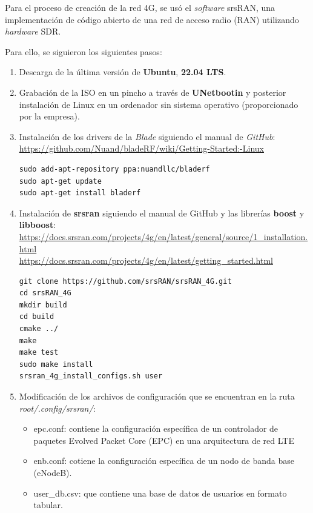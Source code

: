 Para el proceso de creación de la red 4G, se usó el \textit{software} srsRAN, una implementación de código abierto de una red de acceso radio (RAN) utilizando \textit{hardware} SDR.

Para ello, se siguieron los siguientes pasos:


\begin{enumerate}
\item Descarga de la última versión de \textbf{Ubuntu}, \textbf{22.04 LTS}.
\item Grabación de la ISO en un pincho a través de \textbf{UNetbootin} y posterior instalación de Linux en un ordenador sin sistema operativo (proporcionado por la empresa).
\item Instalación de los drivers de la \textit{Blade} siguiendo el manual de \textit{GitHub}:\\
 \url{https://github.com/Nuand/bladeRF/wiki/Getting-Started:-Linux}

\begin{lstlisting}
sudo add-apt-repository ppa:nuandllc/bladerf
sudo apt-get update
sudo apt-get install bladerf
\end{lstlisting}

\item Instalación de \textbf{srsran} siguiendo el manual de GitHub y las librerías \textbf{boost} y \textbf{libboost}:\\
\url{https://docs.srsran.com/projects/4g/en/latest/general/source/1_installation.html}\\
\url{https://docs.srsran.com/projects/4g/en/latest/getting_started.html}

\begin{lstlisting}
git clone https://github.com/srsRAN/srsRAN_4G.git
cd srsRAN_4G
mkdir build
cd build
cmake ../
make
make test
sudo make install
srsran_4g_install_configs.sh user
\end{lstlisting}

\item Modificación de los archivos de configuración que se encuentran en la ruta \textit{root/.config/srsran/}:
\begin{itemize}
	\item epc.conf: contiene la configuración específica de un controlador de paquetes Evolved Packet Core (EPC) en una arquitectura de red LTE 
	\item enb.conf: cotiene la configuración específica de un nodo de banda base (eNodeB).
	\item user_db.csv: que contiene una base de datos de usuarios en formato tabular.
\end{itemize}


\end{enumerate}
